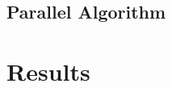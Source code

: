 \documentclass[12pt,a4paper]{report}
\begin{document}
\subsection*{Parallel Algorithm}

\section*{Results}
\end{document}
